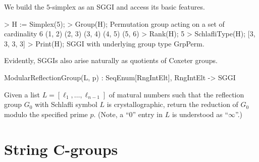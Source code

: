 \documentclass{documentation}
\begin{document}
\begin{example}[Simplex]
We build the $5$-simplex as an SGGI and access its basic features.
\begin{code}
> H := Simplex(5);
> Group(H);
Permutation group acting on a set of cardinality 6
   (1, 2)
   (2, 3)
   (3, 4)
   (4, 5)
   (5, 6)
> Rank(H);
5
> SchlafliType(H);
[3, 3, 3, 3]
> Print(H);
SGGI with underlying group type GrpPerm.
\end{code}
\end{example}

Evidently, SGGIs also arise naturally as quotients of Coxeter groups.
\begin{intrinsics}
ModularReflectionGroup(L, p) : SeqEnum[RngIntElt], RngIntElt -> SGGI
\end{intrinsics}
Given a list $L=[\ell_1,\ldots,\ell_{n-1}]$ of matural numbers such that the reflection group $G_0$
with Schlafli symbol $L$ is crystallographic, return the reduction of $G_0$ modulo
the specified prime $p$. (Note, a ``0'' entry in $L$ is understood as ``$\infty$''.)




\chapter{String C-groups}




\backmatter


\begin{bibdiv}
\begin{biblist}



\end{biblist}
\end{bibdiv}

\printindex
\end{document}
